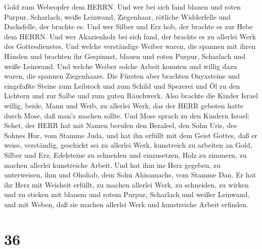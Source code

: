 Gold zum Webeopfer dem HERRN.  Und wer bei sich fand blauen
und roten Purpur, Scharlach, weiße Leinwand, Ziegenhaar, rötliche
Widderfelle und Dachsfelle, der brachte es.  Und wer Silber
und Erz hob, der brachte es zur Hebe dem HERRN. Und wer Akazienholz bei
sich fand, der brachte es zu allerlei Werk des Gottesdienstes.
 Und welche verständige Weiber waren, die spannen mit ihren
Händen und brachten ihr Gespinnst, blauen und roten Purpur, Scharlach
und weiße Leinwand.  Und welche Weiber solche Arbeit
konnten und willig dazu waren, die spannen Ziegenhaare. 
Die Fürsten aber brachten Onyxsteine und eingefaßte Steine zum Leibrock
und zum Schild  und Spezerei und Öl zu den Lichtern und zur
Salbe und zum guten Räuchwerk.  Also brachte die Kinder
Israel willig, beide, Mann und Weib, zu allerlei Werk, das der HERR
geboten hatte durch Mose, daß man's machen sollte.  Und
Mose sprach zu den Kindern Israel: Sehet, der HERR hat mit Namen berufen
den Bezaleel, den Sohn Uris, des Sohnes Hur, vom Stamme Juda,
 und hat ihn erfüllt mit dem Geist Gottes, daß er weise,
verständig, geschickt sei zu allerlei Werk,  kunstreich zu
arbeiten an Gold, Silber und Erz,  Edelsteine zu schneiden
und einzusetzen, Holz zu zimmern, zu machen allerlei kunstreiche Arbeit.
 Und hat ihm ins Herz gegeben, zu unterweisen, ihm und
Oholiab, dem Sohn Ahisamachs, vom Stamme Dan.  Er hat ihr
Herz mit Weisheit erfüllt, zu machen allerlei Werk, zu schneiden, zu
wirken und zu sticken mit blauem und rotem Purpur, Scharlach und weißer
Leinwand, und mit Weben, daß sie machen allerlei Werk und kunstreiche
Arbeit erfinden.

\hypertarget{section-35}{%
\section{36}\label{section-35}}

